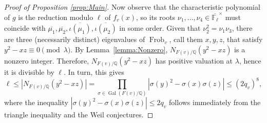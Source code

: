 \begin{proof}[Proof of Proposition \ref{prop:Main}]
Now observe that the characteristic polynomial of $g$ is the reduction modulo $\ell$ of $f_v(x)$, so its roots $\nu_1, \ldots, \nu_4 \in \overline{\mathbb{F}_\ell}^\times$ must coincide with $\overline{\mu_1}, \overline{\mu_2}, \overline{\iota(\mu_1)}, \overline{\iota(\mu_2)}$ in some order.
Given that $\nu_2^2=\nu_1\nu_3$, there are three (necessarily distinct) eigenvalues of $\operatorname{Frob}_v$, call them $x,y,z$, that satisfy $y^2- xz \equiv 0 \pmod{ \lambda}$.  
By Lemma~\ref{lemma:Nonzero}, $N_{F(v)/\mathbb{Q}}(y^2-xz)$ is a nonzero integer. 
 Therefore, $N_{F(v)/\mathbb{Q}}(y^2-xz)$ has positive valuation at $\lambda$, hence it is divisible by $\ell$. In turn, this gives
 \[
 \ell \leq |N_{F(v)/\mathbb{Q}}(y^2-xz)| = \prod_{\sigma \in \operatorname{Gal}(F(v)/\mathbb{Q})}|\sigma(y)^2-\sigma(x)\sigma(z)| \leq (2q_v)^8,
 \]
where the inequality $|\sigma(y)^2-\sigma(x)\sigma(z)| \leq 2q_v$ follows immediately from the triangle inequality and the Weil conjectures.
\end{proof}

